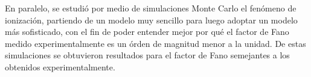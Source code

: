 
En paralelo, se estudió por medio de simulaciones Monte Carlo el fenómeno de ionización, partiendo de un modelo muy sencillo para luego adoptar un modelo más sofisticado, con el fin de poder entender mejor por qué el factor de Fano medido experimentalmente es un órden de magnitud menor a la unidad. De estas simulaciones se obtuvieron resultados para el factor de Fano semejantes a los obtenidos experimentalmente.






